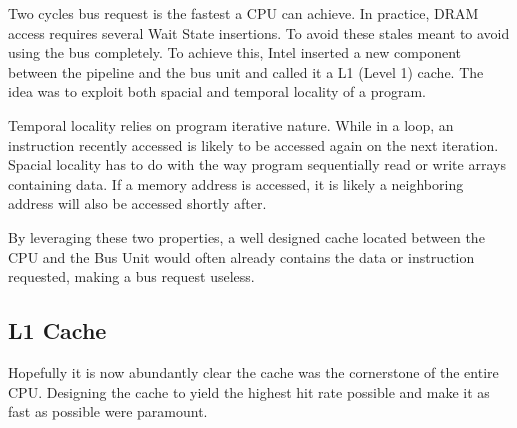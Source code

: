 \par
Two cycles bus request is the fastest a CPU can achieve. In practice, DRAM access requires several Wait State insertions.
To avoid these stales meant to avoid using the bus completely. To achieve this, Intel inserted a new component between the pipeline and the bus unit and called it a L1 (Level 1) cache. The idea was to exploit both spacial and temporal locality of a program.\\
\par
Temporal locality relies on program iterative nature. While in a loop, an instruction recently accessed is likely to be accessed again on the next iteration. Spacial locality has to do with the way program sequentially read or write arrays containing data. If a memory address is accessed, it is likely a neighboring address will also be accessed shortly after.\\
\par
By leveraging these two properties, a well designed cache located between the CPU and the Bus Unit would often already contains the data or instruction requested, making a bus request useless.\\
\par
{}



\vspace{-20pt}
\subsection{L1 Cache}
Hopefully it is now abundantly clear the cache was the cornerstone of the entire CPU. Designing the cache to yield the highest hit rate possible and make it as fast as possible were paramount. 

